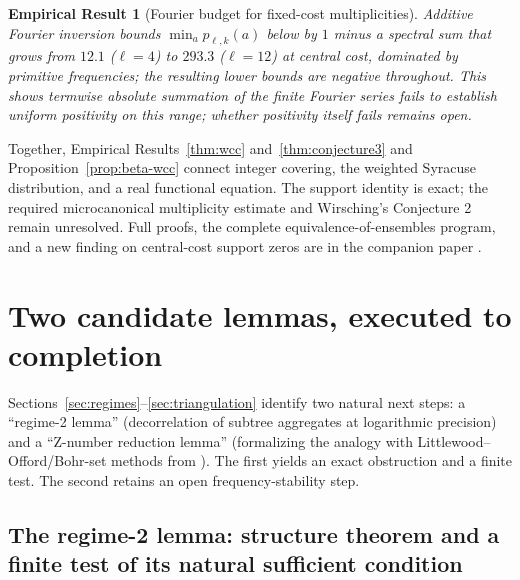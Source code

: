 \documentclass[11pt]{article}
\newtheorem{empirical}[theorem]{Empirical Result}
\theoremstyle{definition}
\theoremstyle{remark}
\begin{document}
\begin{empirical}[Fourier budget for fixed-cost multiplicities]
\label{thm:microcanonical-fourier}
Additive Fourier inversion bounds $\min_a p_{\ell,k}(a)$ below by
$1$ minus a spectral sum that grows from $12.1$ ($\ell=4$) to $293.3$
($\ell=12$) at central cost, dominated by primitive frequencies; the
resulting lower bounds are negative throughout. This shows termwise
absolute summation of the finite Fourier series fails to establish
uniform positivity on this range; whether positivity itself fails
remains open.
\end{empirical}

Together, Empirical Results~\ref{thm:wcc} and~\ref{thm:conjecture3} and
Proposition~\ref{prop:beta-wcc} connect integer covering, the weighted
Syracuse distribution, and a real functional equation. The support
identity is exact; the required microcanonical multiplicity estimate
and Wirsching's Conjecture 2 remain unresolved. Full proofs, the
complete equivalence-of-ensembles program, and a new finding on
central-cost support zeros are in the companion paper
\cite{WirschingCompanion}.

\section{Two candidate lemmas, executed to completion}
\label{sec:lemmas}

Sections~\ref{sec:regimes}--\ref{sec:triangulation} identify two
natural next steps: a ``regime-2 lemma'' (decorrelation of subtree
aggregates at logarithmic precision) and a ``Z-number reduction lemma''
(formalizing the analogy with Littlewood--Offord/Bohr-set methods from
\cite{Tao2011}). The first yields an exact obstruction and a finite
test. The second retains an open frequency-stability step.

\subsection{The regime-2 lemma: structure theorem and a finite test of
its natural sufficient condition}
\end{document}
